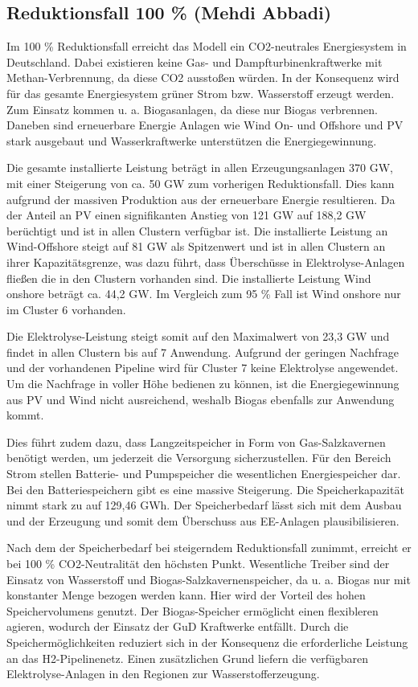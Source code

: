 \newpage
\subsection{Reduktionsfall 100 \% (Mehdi Abbadi)}
Im 100 \% Reduktionsfall erreicht das Modell ein CO2-neutrales Energiesystem in Deutschland. Dabei existieren keine Gas- und Dampfturbinenkraftwerke mit Methan-Verbrennung, da diese CO2 ausstoßen würden. In der Konsequenz wird für das gesamte Energiesystem grüner Strom bzw. Wasserstoff erzeugt werden. Zum Einsatz kommen u. a. Biogasanlagen, da diese nur Biogas verbrennen. Daneben sind erneuerbare Energie Anlagen wie Wind On- und Offshore und PV stark ausgebaut und Wasserkraftwerke unterstützen die Energiegewinnung. 

Die gesamte installierte Leistung beträgt in allen Erzeugungsanlagen 370 GW, mit einer Steigerung von ca. 50 GW zum vorherigen Reduktionsfall. Dies kann aufgrund der massiven Produktion aus der erneuerbare Energie resultieren. Da der Anteil an PV einen signifikanten Anstieg von 121 GW auf 188,2 GW berüchtigt und ist in allen Clustern verfügbar ist. Die installierte Leistung an Wind-Offshore steigt auf 81 GW als Spitzenwert und ist in allen Clustern an ihrer Kapazitätsgrenze, was dazu führt, dass Überschüsse in Elektrolyse-Anlagen fließen die in den Clustern vorhanden sind.  Die installierte Leistung Wind onshore beträgt ca. 44,2 GW. Im Vergleich zum 95 \% Fall ist Wind onshore nur im Cluster 6 vorhanden. 

Die Elektrolyse-Leistung steigt somit auf den Maximalwert von 23,3 GW und findet in allen Clustern bis auf 7 Anwendung. Aufgrund der geringen Nachfrage und der vorhandenen Pipeline wird für Cluster 7 keine Elektrolyse angewendet. Um die Nachfrage in voller Höhe bedienen zu können, ist die Energiegewinnung aus PV und Wind nicht ausreichend, weshalb Biogas ebenfalls zur Anwendung kommt. 

Dies führt zudem dazu, dass Langzeitspeicher in Form von Gas-Salzkavernen benötigt werden, um jederzeit die Versorgung sicherzustellen. Für den Bereich Strom stellen Batterie- und Pumpspeicher die wesentlichen Energiespeicher dar. Bei den Batteriespeichern gibt es eine massive Steigerung. Die Speicherkapazität nimmt stark zu auf 129,46 GWh. Der Speicherbedarf lässt sich mit dem Ausbau und der Erzeugung und somit dem Überschuss aus EE-Anlagen plausibilisieren.  

Nach dem der Speicherbedarf bei steigerndem Reduktionsfall zunimmt, erreicht er bei 100 \% CO2-Neutralität den höchsten Punkt. Wesentliche Treiber sind der Einsatz von Wasserstoff und Biogas-Salzkavernenspeicher, da u. a. Biogas nur mit konstanter Menge bezogen werden kann. Hier wird der Vorteil des hohen Speichervolumens genutzt. Der Biogas-Speicher ermöglicht einen flexibleren agieren, wodurch der Einsatz der GuD Kraftwerke entfällt. Durch die Speichermöglichkeiten reduziert sich in der Konsequenz die erforderliche Leistung an das H2-Pipelinenetz. Einen zusätzlichen Grund liefern die verfügbaren Elektrolyse-Anlagen in den Regionen zur Wasserstofferzeugung.

